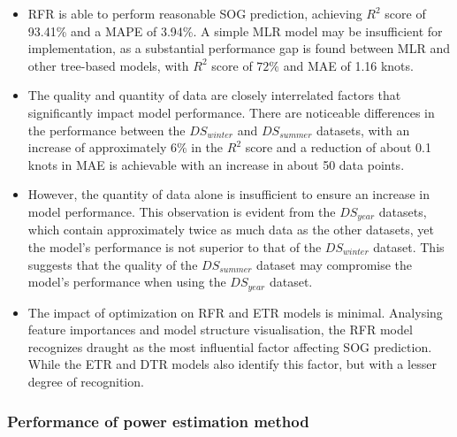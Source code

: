 \documentclass[]{interact}
\theoremstyle{plain}%
\theoremstyle{definition}
\theoremstyle{remark}
\begin{document}
\begin{itemize}
  
\item RFR is able to perform reasonable SOG prediction, achieving $R^2$ score of 93.41\% and a MAPE of 3.94\%. A simple MLR model may be insufficient for implementation, as a substantial performance gap is found between MLR and other tree-based models, with $R^2$ score of $72\%$ and MAE of 1.16 knots.

\item The quality and quantity of data are closely interrelated factors that significantly impact model performance. There are noticeable differences in the performance between the $DS_{winter}$ and $DS_{summer}$ datasets, with an increase of approximately $6\%$ in the $R^2$ score and a reduction of about 0.1 knots in MAE is achievable with an increase in about 50 data points.

\item However, the quantity of data alone is insufficient to ensure an increase in model performance. This observation is evident from the $DS_{year}$ datasets, which contain approximately twice as much data as the other datasets, yet the model's performance is not superior to that of the $DS_{winter}$ dataset. This suggests that the quality of the $DS_{summer}$ dataset may compromise the model's performance when using the $DS_{year}$ dataset.

\item The impact of optimization on RFR and ETR models is minimal. Analysing feature importances and model structure visualisation, the RFR model recognizes draught as the most influential factor affecting SOG prediction. While the ETR and DTR models also identify this factor, but with a lesser degree of recognition.

\end{itemize}

\subsubsection{Performance of power estimation method}
\end{document}
